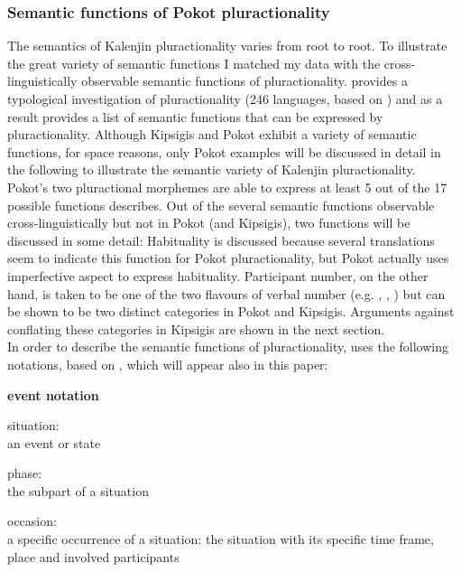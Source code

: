 \documentclass[output=paper,colorlinks,citecolor=brown
]{langscibook}
\begin{document}
\subsubsection{Semantic functions of Pokot pluractionality}\label{sec:fiebig:semantics}

The semantics of Kalenjin pluractionality varies from root to root. To illustrate the great variety of semantic functions I matched my data with the cross- linguistically observable semantic functions of pluractionality. \cite{Mattiola2019} provides a typological investigation of pluractionality (246 languages, based on \citealt{wals-80}) and as a result provides a list of semantic functions that can be expressed by pluractionality. Although Kipsigis and Pokot exhibit a variety of semantic functions, for space reasons, only Pokot examples will be discussed in detail in the following to illustrate the semantic variety of Kalenjin pluractionality. \\
Pokot's two pluractional morphemes are able to express at least 5 out of the 17 possible functions \cite{Mattiola2019} describes. Out of the several semantic functions observable cross-linguistically but not in Pokot (and Kipsigis), two functions will be discussed in some detail: Habituality is discussed because several translations seem to indicate this function for Pokot pluractionality, but Pokot actually uses imperfective aspect to express habituality. Participant number, on the other hand, is taken to be one of the two flavours of verbal number (e.g. \citealt{Corbett2000}, \citealt{Amato2018}, \citealt{Thornton2019}) but can be shown to be two distinct categories in Pokot and Kipsigis. Arguments against conflating these categories in Kipsigis are shown in the next section. \\
In order to describe the semantic functions of pluractionality, \cite{Mattiola2019} uses the following notations, based on \citet[77]{Cusic81}, which will appear also in this paper:

\ea \textbf{event notation} \citep[21]{Mattiola2019}

\begin{xlist}

\ex situation: \\ an event or state

\ex phase: \\ the subpart of a situation

\ex occasion: \\ a specific occurrence of a situation: the situation with its specific time frame, place and involved participants

\end{xlist}
\end{document}
